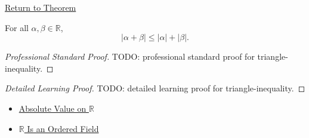 \newpage
{}
\label{prf:triangle-inequality}

\begin{remark*}[Return]
\hyperref[thm:triangle-inequality]{Return to Theorem}
\end{remark*}

\begin{theorem*}
For all $\alpha,\beta\in\mathbb{R}$,
\[
|\alpha+\beta|\le |\alpha|+|\beta|.
\]
\end{theorem*}

\begin{proof}[Professional Standard Proof]
\LRAProofBodyStart
TODO: professional standard proof for triangle-inequality.
\end{proof}

\begin{proof}[Detailed Learning Proof]
\LRAProofBodyStart
TODO: detailed learning proof for triangle-inequality.
\end{proof}

\begin{remark*}
\end{remark*}

\begin{dependencies}
\begin{itemize}
  \item \hyperref[def:real-chapter-absolute-value-on-r]{Absolute Value on $\mathbb{R}$}
  \item \hyperref[thm:r-is-an-ordered-field]{$\mathbb{R}$ Is an Ordered Field}
\end{itemize}
\end{dependencies}

\clearpage
